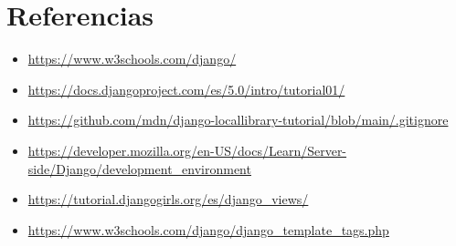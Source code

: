 \documentclass{article}
\begin{document}
\clearpage

\section{Referencias}
\begin{itemize}			
        \item \url{https://www.w3schools.com/django/}
        \item \url{https://docs.djangoproject.com/es/5.0/intro/tutorial01/}
        \item \url{https://github.com/mdn/django-locallibrary-tutorial/blob/main/.gitignore}
        \item \url{https://developer.mozilla.org/en-US/docs/Learn/Server-side/Django/development_environment}
        \item \url{https://tutorial.djangogirls.org/es/django_views/}
        \item \url{https://www.w3schools.com/django/django_template_tags.php}
\end{itemize}	
	
%
%
%
			
\end{document}
